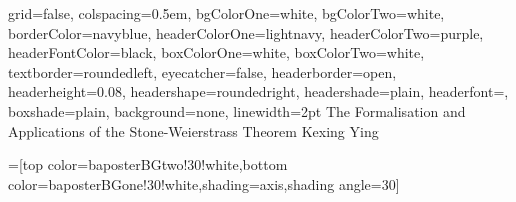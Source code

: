 \documentclass[landscape,final,a0paper]{baposter}
\begin{document}
\newlength{\leftimgwidth}
\begin{poster}%
  {
  grid=false,
  colspacing=0.5em,
  bgColorOne=white,
  bgColorTwo=white,
  borderColor=navyblue,
  headerColorOne=lightnavy,
  headerColorTwo=purple,
  headerFontColor=black,
 boxColorOne=white,
 boxColorTwo=white,
  textborder=roundedleft,
  eyecatcher=false,
  headerborder=open,
  headerheight=0.08\textheight,
  headershape=roundedright,
  headershade=plain,
  headerfont=\Large\textsf, %
  boxshade=plain,
  background=none,
  linewidth=2pt
  }
  {} %
  {\sf %
  \vspace*{5mm}
  \hspace*{2mm} The Formalisation and Applications of the Stone-Weierstrass Theorem}
  {\linebreak
  \hspace*{4.5mm} Kexing Ying
  }
  { %
  }

  =[top color=baposterBGtwo!30!white,bottom color=baposterBGone!30!white,shading=axis,shading angle=30]

     \setlength{\leftimgwidth}{0.78em+8.0em}

\newcommand{\colouredcircle}[1]{%
      \tikz{\useasboundingbox (-0.2em,-0.32em) rectangle(0.2em,0.32em); \draw[draw=black,fill=baposterBGone!80!black!#1!white,line width=0.03em] (0,0) circle(0.18em);}}


\end{poster}
\end{document}
